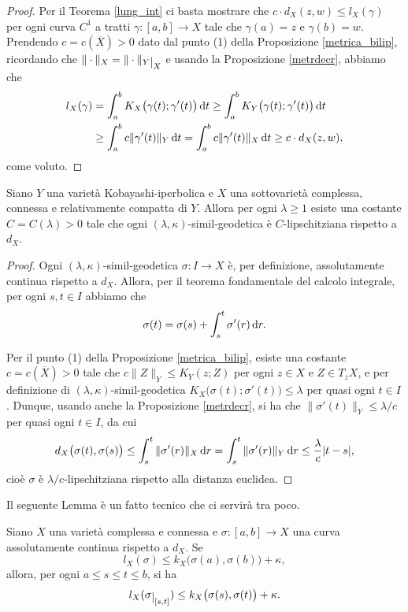 \begin{proof}
    Per il Teorema \ref{lung_int} ci basta mostrare che $c\cdot d_X(z,w) \le l_X(\gamma)$ per ogni curva $C^1$ a tratti $\gamma:[a,b] \longrightarrow X$ tale che $\gamma(a)=z$ e $\gamma(b)=w$. Prendendo $c=c(\overline{X})>0$ dato dal punto (1) della Proposizione \ref{metrica_bilip}, ricordando che $\|\cdot\|_X=\|\cdot\|_Y\restrict{X}$ e usando la Proposizione \ref{metrdecr}, abbiamo che
    \begin{align*}
        l_X(\gamma)&=\int_a^b K_X\big(\gamma(t);\gamma'(t)\big)\mathop{}\!\mathrm{d} t \ge \int_a^b K_Y\big(\gamma(t);\gamma'(t)\big)\mathop{}\!\mathrm{d} t\\
        &\ge \int_a^b c\|\gamma'(t)\|_Y\mathop{}\!\mathrm{d} t=\int_a^b c\|\gamma'(t)\|_X\mathop{}\!\mathrm{d} t\ge c\cdot d_X(z,w),
    \end{align*}
    come voluto.
\end{proof}

\begin{prop} \label{simillip}
    Siano $Y$ una varietà Kobayashi-iperbolica e $X$ una sottovarietà complessa, connessa e relativamente compatta di $Y$. Allora per ogni $\lambda \ge 1$ esiste una costante $C=C(\lambda)>0$ tale che ogni $(\lambda,\kappa)$-simil-geodetica è $C$-lipschitziana rispetto a $d_X$.
\end{prop}

\begin{proof}
    Ogni $(\lambda,\kappa)$-simil-geodetica $\sigma:I\longrightarrow X$ è, per definizione, assolutamente continua rispetto a $d_X$. Allora, per il teorema fondamentale del calcolo integrale, per ogni $s,t\in I$ abbiamo che
    $$\sigma(t)=\sigma(s)+\int_s^t\sigma'(r)\mathop{}\!\mathrm{d} r.$$
    
    Per il punto (1) della Proposizione \ref{metrica_bilip}, esiste una costante $c=c(\overline{X})>0$ tale che $c\|Z\|_Y \le K_Y(z;Z)$ per ogni $z\in X$ e $Z\in T_zX$, e per definizione di $(\lambda,\kappa)$-simil-geodetica $K_X\big(\sigma(t);\sigma'(t)\big) \le \lambda$ per quasi ogni $t\in I$. Dunque, usando anche la Proposizione \ref{metrdecr}, si ha che $\|\sigma'(t)\|_Y \le \lambda/c$ per quasi ogni $t\in I$, da cui
    $$d_X\big(\sigma(t),\sigma(s)\big) \le \int_s^t\|\sigma'(r)\|_X\mathop{}\!\mathrm{d} r=\int_s^t\|\sigma'(r)\|_Y\mathop{}\!\mathrm{d} r \le \frac{\lambda}{c}|t-s|,$$
    cioè $\sigma$ è $\lambda/c$-lipschitziana rispetto alla distanza euclidea.
\end{proof}

Il seguente Lemma è un fatto tecnico che ci servirà tra poco.

\begin{lm} \label{restrdis}
    Siano $X$ una varietà complessa e connessa e $\sigma:[a,b] \longrightarrow X$ una curva assolutamente continua rispetto a $d_X$. Se
    $$l_X(\sigma) \le k_X\big(\sigma(a),\sigma(b)\big)+\kappa,$$
    allora, per ogni $a \le s \le t \le b$, si ha
    $$l_X(\sigma\restrict{[s,t]}) \le k_X\big(\sigma(s),\sigma(t)\big)+\kappa.$$
\end{lm}

